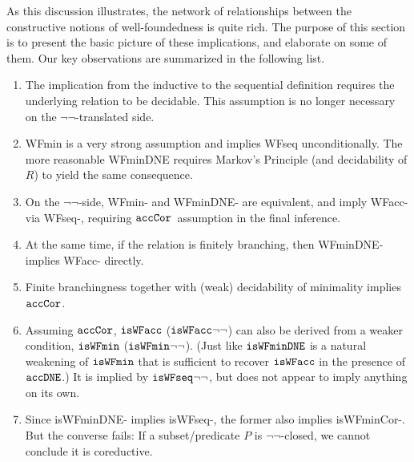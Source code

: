 As this discussion illustrates, the network of relationships between the
constructive notions of well-foundedness is quite rich.  The purpose of
this section is to present the basic picture of these implications,
and elaborate on some of them.  Our key observations are summarized
in the following list.
\begin{enumerate}
  \item The implication from the inductive to the sequential definition
  requires the underlying relation to be decidable. This assumption is no longer
  necessary on the $\lnot\lnot$-translated side.
  \item WFmin is a very strong assumption and implies WFseq unconditionally.
  The more reasonable WFminDNE requires Markov's Principle
  (and decidability of $R$) to yield the same consequence.
  \item On the $\lnot\lnot$-side, WFmin- and WFminDNE- are equivalent,
  and imply WFacc- via WFseq-, requiring {$\mathtt{accCor}$} assumption in the final inference.
  \item At the same time, if the relation is finitely branching, then WFminDNE-
  implies WFacc- directly.
  \item Finite branchingness together with (weak) decidability of minimality
  implies $\mathtt{accCor}$.
  \item Assuming $\mathtt{accCor}$, $\mathtt{isWFacc}$ ($\mathtt{isWFacc}{\lnot\lnot}$) can also be derived from a weaker condition, $\mathtt{isWFmin}$ ($\mathtt{isWFmin}{\lnot\lnot}$).
  (Just like $\mathtt{isWFminDNE}$ is a natural weakening of $\mathtt{isWFmin}$ that is sufficient to recover $\mathtt{isWFacc}$ in the presence of {$\mathtt{accDNE}$}.)
  It is implied by $\mathtt{isWFseq}{\lnot\lnot}$, but does not appear to imply anything on its own.

  \item Since isWFminDNE- implies isWFseq-, the former also implies isWFminCor-.
  But the converse fails: If a subset/predicate $P$ is $\lnot\lnot$-closed,
  we cannot conclude it is coreductive.


\end{enumerate}
